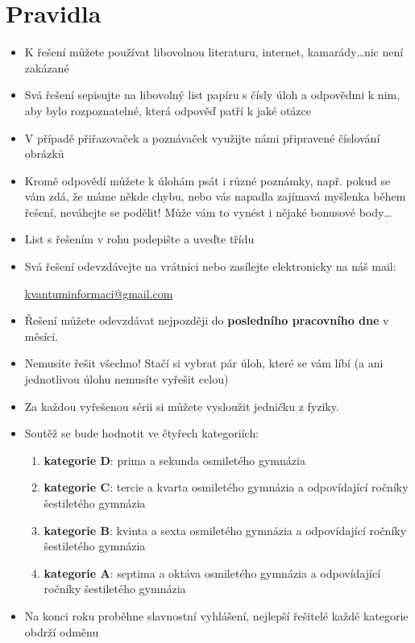\documentclass[12pt]{article}
\begin{document}
\section*{Pravidla}
\begin{itemize}
    \item K řešení můžete používat libovolnou literaturu, internet, kamarády\dots nic není zakázané
    \item Svá řešení sepisujte na libovolný list papíru s čísly úloh a odpovědmi k nim, aby bylo rozpoznatelné, která odpověď patří k jaké otázce
    \item V případě přiřazovaček a poznávaček využijte námi připravené číslování obrázků
    \item Kromě odpovědí můžete k úlohám psát i různé poznámky, např. pokud se vám zdá, že máme někde chybu, nebo vás napadla zajímavá myšlenka během řešení, neváhejte se podělit! Může vám to vynést i nějaké bonusové body\dots
    \item List s řešením v rohu podepište a uveďte třídu 
    \item Svá řešení odevzdávejte na vrátnici nebo zasílejte elektronicky na náš mail: 
    
    \color{blue}
    \href{mailto:kvantuminformaci@gmail.com}{kvantuminformaci@gmail.com}
    \color{black}
    \item Řešení můžete odevzdávat nejpozději do \textbf{posledního pracovního dne} v měsíci.
    \item Nemusíte řešit všechno! Stačí si vybrat pár úloh, které se vám líbí (a ani jednotlivou úlohu nemusíte vyřešit celou)
    \item Za každou vyřešenou sérii si můžete vysloužit jedničku z fyziky.
    \item Soutěž se bude hodnotit ve čtyřech kategoriích:
    \begin{enumerate}
        \item \textbf{kategorie D}: prima a sekunda osmiletého gymnázia
        \item \textbf{kategorie C}: tercie a kvarta osmiletého gymnázia a odpovídající ročníky šestiletého gymnázia
        \item \textbf{kategorie B}: kvinta a sexta osmiletého gymnázia a odpovídající ročníky šestiletého gymnázia
        \item \textbf{kategorie A}: septima a oktáva osmiletého gymnázia a odpovídající ročníky šestiletého gymnázia
    \end{enumerate}
    \item Na konci roku proběhne slavnostní vyhlášení, nejlepší řešitelé každé kategorie obdrží odměnu
\end{itemize} 
\end{document}
